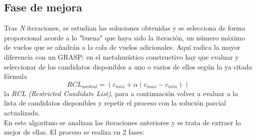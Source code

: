 \subsection{Fase de mejora}
Tras \textit{N} iteraciones, se estudian las soluciones obtenidas y se selecciona de forma proporcional acorde a lo "buena" que haya sido la iteración, un número máximo de vuelos que se añadrán a la cola de vuelos adicionales. Aquí radica la mayor diferencia con un GRASP: en el metahurístico constructivo hay que evaluar y seleccionar  de los candidatos disponibles a uno o varios de ellos según la ya citada fórmula
\begin{equation}
{RCL}_{umbral} = (c_{min}+\alpha(c_{max} - c_{min} ))
\end{equation}la \textit{RCL (Restricted Candidate List)}, para a continuación volver a evaluar a la lista de candidatos disponibles y repetir el proceso con la solución parcial actualizada.\\
En este algoritmo se analizan las iteraciones anteriores y se trata de extraer lo mejor de ellas. El proceso se realiza en 2 fases: 
